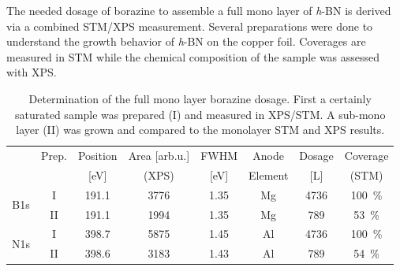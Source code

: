 The needed dosage of borazine to assemble a full mono layer of \textit{h}-BN is derived via a combined STM/XPS measurement. Several preparations were done to understand the growth behavior of \textit{h}-BN on the copper foil. Coverages are measured in STM while the chemical composition of the sample was assessed with XPS.
\begin{table}[h!]
	\centering
	\caption{Determination of the full mono layer borazine dosage. First a certainly saturated sample was prepared (I) and measured in XPS/STM. A sub-mono layer (II) was grown and compared to the monolayer STM and XPS results.}
	\begin{tabular}{cccccccc}
		& Prep. & Position    & Area [arb.u.] & FWHM  & Anode & Dosage  & Coverage\\ 
		&	  &	[eV]	& (XPS)		&[eV]	&Element&[L]	  & (STM) \\ \hline \hline
		\multirow{2}{*}{B1s} 	&I& 191.1 & 3776 & 1.35 & Mg & 4736 & \SI{100}{\percent}\\
		&II& 191.1 & 1994 & 1.35 & Mg & 789 &\SI{53}{\percent}\\ \hline
		\multirow{2}{*}{N1s} 	&I& 398.7 & 5875 & 1.45 & Al  & 4736 & \SI{100}{\percent}\\
		&II& 398.6 & 3183 & 1.43 & Al & 789 &\SI{54}{\percent}\\
	\end{tabular}
\end{table}


